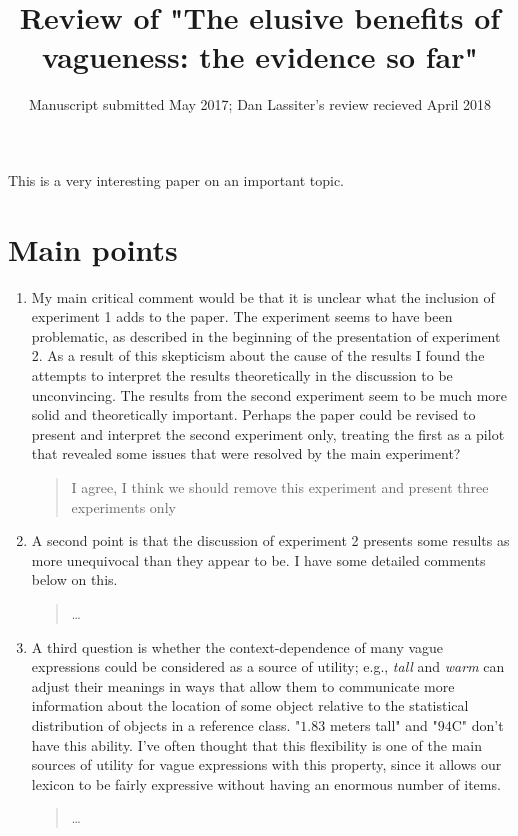 \documentclass{tufte-handout}
\title{Review of "The elusive benefits of vagueness: the evidence so far"}
\date{Manuscript submitted May 2017; Dan Lassiter's review recieved April 2018}
\begin{document}
\maketitle

This is a very interesting paper on an important topic. 

\section{Main points}

\begin{enumerate}

\item My main critical comment would be that it is unclear what the inclusion of experiment 1 adds to the paper. The experiment seems to have been problematic, as described in the beginning of the presentation of experiment 2. As a result of this skepticism about the cause of the results I found the attempts to interpret the results theoretically in the discussion to be unconvincing. The results from the second experiment seem to be much more solid and theoretically important. Perhaps the paper could be revised to present and interpret the second experiment only, treating the first as a pilot that revealed some issues that were resolved by the main experiment?
\begin{quote}I agree, I think we should remove this experiment and present three experiments only\end{quote}

\item A second point is that the discussion of experiment 2 presents some results as more unequivocal than they appear to be. I have some detailed comments below on this.
\begin{quote}\ldots\end{quote}

\item A third question is whether the context-dependence of many vague expressions could be considered as a source of utility; e.g., \emph{tall} and \emph{warm} can adjust their meanings in ways that allow them to communicate more information about the location of some object relative to the statistical distribution of objects in a reference class. "$1.83$ meters tall" and "$94$\textdegree C" don't have this ability. I've often thought that this flexibility is one of the main sources of utility for vague expressions with this property, since it allows our lexicon to be fairly expressive without having an enormous number of items.
\begin{quote}\ldots\end{quote}

\end{enumerate}
\end{document}
